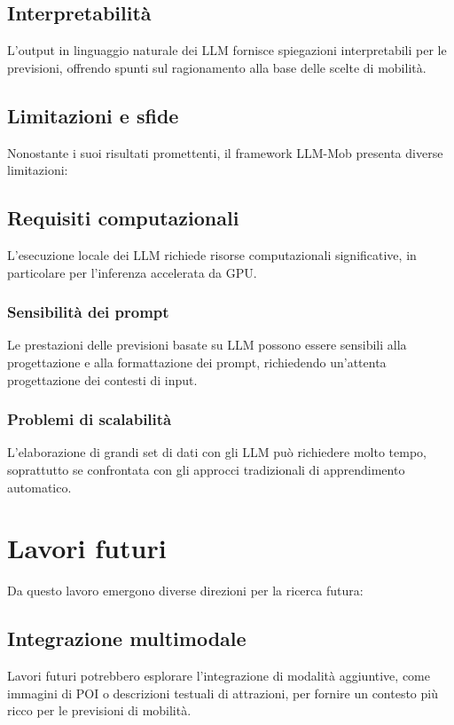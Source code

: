\documentclass[12pt,a4paper]{article}
\begin{document}
\subsection{Interpretabilità}
L'output in linguaggio naturale dei LLM fornisce spiegazioni interpretabili per le previsioni, offrendo spunti sul ragionamento alla base delle scelte di mobilità.

\subsection{Limitazioni e sfide}

Nonostante i suoi risultati promettenti, il framework LLM-Mob presenta diverse limitazioni:

\subsection{Requisiti computazionali}
L'esecuzione locale dei LLM richiede risorse computazionali significative, in particolare per l'inferenza accelerata da GPU.

\subsubsection{Sensibilità dei prompt}
Le prestazioni delle previsioni basate su LLM possono essere sensibili alla progettazione e alla formattazione dei prompt, richiedendo un'attenta progettazione dei contesti di input.

\subsubsection{Problemi di scalabilità}
L'elaborazione di grandi set di dati con gli LLM può richiedere molto tempo, soprattutto se confrontata con gli approcci tradizionali di apprendimento automatico.


\newpage

\section{Lavori futuri}

Da questo lavoro emergono diverse direzioni per la ricerca futura:

\subsection{Integrazione multimodale}
Lavori futuri potrebbero esplorare l'integrazione di modalità aggiuntive, come immagini di POI o descrizioni testuali di attrazioni, per fornire un contesto più ricco per le previsioni di mobilità.
\end{document}
